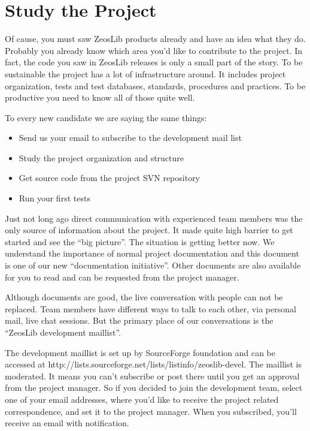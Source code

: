 \documentclass[a4paper,12pt,oneside]{book}
\begin{document}
\section{Study the Project}
Of cause, you must saw ZeosLib products already and have an idea what they do.
Probably you already know which area you’d like to contribute to the project.
In fact, the code you saw in ZeosLib releases is only a small part of the story.
To be sustainable the project has a lot of infrastructure around.
It includes project organization, tests and test databases, standards, procedures and practices.
To be productive you need to know all of those quite well.

To every new candidate we are saying the same things:
\begin{itemize}
  \item Send us your email to subscribe to the development mail list
	\item Study the project organization and structure
	\item Get source code from the project SVN repository
	\item Run your first tests
\end{itemize}

Just not long ago direct communication with experienced team members was the only source of information about the project.
It made quite high barrier to get started and see the “big picture”.
The situation is getting better now.
We understand the importance of normal project documentation and this document is one of our new “documentation initiative”.
Other documents are also available for you to read and can be requested from the project manager.

Although documents are good, the live conversation with people can not be replaced.
Team members have different ways to talk to each other, via personal mail, live chat sessions.
But the primary place of our conversations is the “ZeosLib development maillist”.

The development maillist is set up by SourceForge foundation and can be accessed at http://lists.sourceforge.net/lists/listinfo/zeoslib-devel.
The maillist is moderated.
It means you can’t subscribe or post there until you get an approval from the project manager.
So if you decided to join the development team, select one of your email addresses, where you’d like to receive the project related correspondence, and set it to the project manager.
When you subscribed, you’ll receive an email with notification. 
\end{document}
